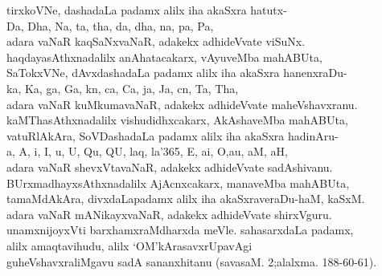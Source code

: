 \begin{entry}
\begin{shl}
tirxkoVNe, dashadaLa padamx alilx iha akaSxra hatutx-\\[1.2pt]
Da, Dha, Na, ta, tha, da, dha, na, pa, Pa,\\[1.2pt]
adara vaNaR kaqSaNxvaNaR, adakekx adhideVvate viSuNx.\\[1.2pt]
haqdayasAthxnadalilx anAhatacakarx, vAyuveMba mahABUta,\\[1.2pt]
SaTokxVNe, dAvxdashadaLa padamx alilx iha akaSxra hanenxraDu-\\[1.2pt]
ka, Ka, ga, Ga, kn, ca, Ca, ja, Ja, cn, Ta, Tha,\\[1.2pt]
adara vaNaR kuMkumavaNaR, adakekx adhideVvate maheVshavxranu.\\[1.2pt]
kaMThasAthxnadalilx vishudidhxcakarx, AkAshaveMba mahABUta, \\[1.2pt]
vatuRlAkAra, SoVDashadaLa padamx alilx iha akaSxra hadinAru-\\[1.2pt]
a, A, i, I, u, U, Qu, QU, laq, la\char'365, E, ai, O,\break au, aM, aH,\\[1.2pt]
adara vaNaR shevxVtavaNaR, adakekx adhideVvate sadAshivanu.\\[1.2pt]
BUrxmadhayxsAthxnadalilx AjAcnxcakarx, manaveMba mahABUta, \\[1.2pt]
tamaMdAkAra, divxdaLapadamx alilx iha akaSxraveraDu-haM, kaSxM.\\[1.2pt]
adara vaNaR mANikayxvaNaR, adakekx adhideVvate shirxVguru.\\[1.2pt]
unamxnijoyxVti barxhamxraMdharxda meVle. sahasarxdaLa padamx,\\[1.2pt]
alilx amaqtavihudu, alilx `OM'kArasavxrUpavAgi\\[1.2pt]
guheVshavxraliMgavu sadA sananxhitanu (savasaM. 2;\break alalxma. 188-60-61).
\end{shl}
\end{entry}


